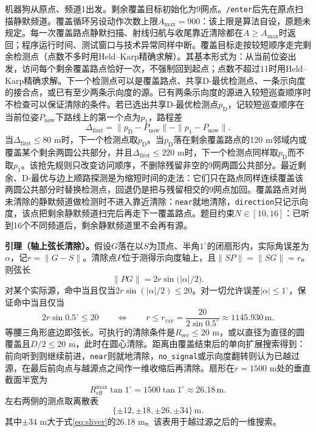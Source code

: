 \documentclass{cumcmthesis}
\begin{document}
机器狗从原点、频道1出发。剩余覆盖目标初始化为9网点。\texttt{/enter}后先在原点扫描静默频道。覆盖循环另设动作次数上限$A_{\max}=900$：该上限是算法自设，原题未规定。每一次覆盖路点静默扫描、射线归航与收尾靠近清除都在$A\ge A_{\max}$时返回；程序运行时间、测试窗口与技术异常同样中断。覆盖目标走按较短顺序走完剩余检测点（点数不多时用Held--Karp精确求解）。其基本形式为：从当前位姿出发，访问每个剩余覆盖路点恰好一次，不强制回到起点；点数不超过11时用Held--Karp精确求解。下一个检测点可以是覆盖路点、共享D-最优检测点、一条示向度的接合点，或已有至少两条示向度的源。已有两条示向度的源进入较短巡查顺序时不检查可以保证清除的条件。若已选出共享D-最优检测点$p_{\mathrm{D}}$，记较短巡查顺序在当前位姿$P_{\mathrm{now}}$下路线上的第一个点为$p_1$，路程差
\begin{equation}
\Delta_{\mathrm{first}}=\|p_{\mathrm{D}}-P_{\mathrm{now}}\|-\|p_1-P_{\mathrm{now}}\|.
\label{eq:dfirst}
\end{equation}
当$\Delta_{\mathrm{first}}\le 80$ m时，下一个检测点取$p_{\mathrm{D}}$。当$p_{\mathrm{D}}$落在剩余覆盖路点的120 m邻域内或覆盖某个剩余两圆公共部分，并且$\Delta_{\mathrm{first}}\le 220$ m时，下一个检测点同样取$p_{\mathrm{D}}$而不取$p_1$。该抢先规则只改变访问顺序，不删除残留非空的9网两圆公共部分。最近剩余、D-最优与边上顺路探测是为缩短时间的走法：它们只在路点同样连续覆盖该两圆公共部分时替换检测点，回退仍是把与残留相交的9网点加回。覆盖路点对尚未清除的静默频道做检测时不进入靠近清除：\texttt{near}就地清除，\texttt{direction}只记示向度，该点把剩余静默频道扫完后再走下一覆盖路点。题目约束$N\in[10,16]$：已听到16个不同频道后，剩余静默频道里不会再有源。

\textbf{引理（轴上弦长清除）。}假设$G$落在以$S$为顶点、半角$1^\circ$的闭扇形内，实际角误差为$\alpha$，记$r=\|G-S\|$。清除点$P$位于测得示向度轴上，且$\|SP\|=\|SG\|=r$。则弦长
\begin{equation}
\|PG\|=2r\sin\bigl(|\alpha|/2\bigr).
\label{eq:chord}
\end{equation}
对某个实际源，命中当且仅当$2r\sin(|\alpha|/2)\le 20$。对一切允许误差$|\alpha|\le 1^\circ$，保证命中当且仅当
\begin{equation}
2r\sin 0.5^\circ\le 20\qquad\Leftrightarrow\qquad r\le r_{\mathrm{ray}}=\frac{20}{2\sin 0.5^\circ}\approx 1145.930\,\mathrm{m}.
\label{eq:rray}
\end{equation}
等腰三角形底边即弦长。可执行的清除条件是$R_{\mathrm{sec}}\le 20$ m，或以直径为直径的圆覆盖且$D/2\le 20$ m，此时在圆心清除。距离由覆盖结束后的单向扩展搜索得到：前向听到则继续前进，\texttt{near}则就地清除，\texttt{no\_signal}或示向度翻转则认为已越过源，在最后前向点与越源点之间作一维收缩后再清除。扇形在$r=1500$ m处的垂直截面半宽为
\begin{equation}
R_{\mathrm{eff}}^{\max}\tan 1^\circ=1500\tan 1^\circ\approx 26.18\,\mathrm{m}.
\label{eq:sliver}
\end{equation}
左右两侧的测点取离散表
\[
\{\pm 12,\pm 18,\pm 26,\pm 34\}\,\mathrm{m}.
\]
其中$\pm 34$ m大于式\eqref{eq:sliver}的26.18 m。该表用于越过源之后的一维搜索。
\end{document}
